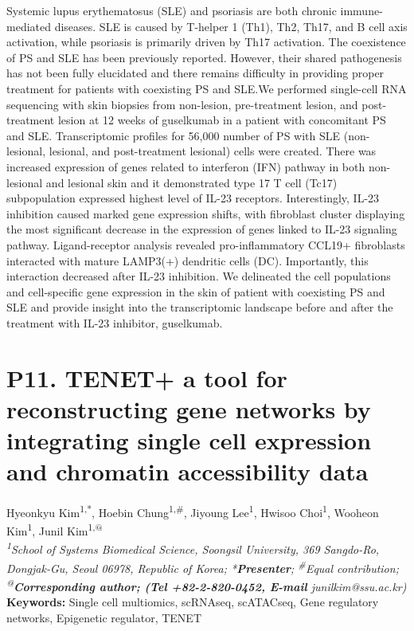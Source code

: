 \noindent
Systemic lupus erythematosus (SLE) and psoriasis are both chronic immune-mediated diseases. SLE is caused by T-helper 1 (Th1), Th2, Th17, and B cell axis activation, while psoriasis is primarily driven by Th17 activation. The coexistence of PS and SLE has been previously reported. However, their shared pathogenesis has not been fully elucidated and there remains difficulty in providing proper treatment for patients with coexisting PS and SLE.We performed single-cell RNA sequencing with skin biopsies from non-lesion, pre-treatment lesion, and post-treatment lesion at 12 weeks of guselkumab in a patient with concomitant PS and SLE. Transcriptomic profiles for 56,000 number of PS with SLE (non-lesional, lesional, and post-treatment lesional) cells were created. There was increased expression of genes related to interferon (IFN) pathway in both non-lesional and lesional skin and it demonstrated type 17 T cell (Tc17) subpopulation expressed highest level of IL-23 receptors. Interestingly, IL-23 inhibition caused marked gene expression shifts, with fibroblast cluster displaying the most significant decrease in the expression of genes linked to IL-23 signaling pathway. Ligand-receptor analysis revealed pro-inflammatory CCL19+ fibroblasts interacted with mature LAMP3(+) dendritic cells (DC). Importantly, this interaction decreased after IL-23 inhibition. We delineated the cell populations and cell-specific gene expression in the skin of patient with coexisting PS and SLE and provide insight into the transcriptomic landscape before and after the treatment with IL-23 inhibitor, guselkumab.
\newpage

\section*{P11. TENET+ a tool for reconstructing gene networks by integrating single cell expression and chromatin accessibility data}

\begin{center}
Hyeonkyu Kim\textsuperscript{1,*}, Hoebin Chung\textsuperscript{1,\#}, Jiyoung Lee\textsuperscript{1}, Hwisoo Choi\textsuperscript{1}, Wooheon Kim\textsuperscript{1}, Junil Kim\textsuperscript{1,@} \\
\vspace{0.3cm}
\textit{\textsuperscript{1}School of Systems Biomedical Science, Soongsil University, 369 Sangdo-Ro, Dongjak-Gu, Seoul 06978, Republic of Korea; *\textbf{Presenter}; \textsuperscript{\#}Equal contribution; \textsuperscript{@}\textbf{Corresponding author; (Tel +82-2-820-0452, E-mail} junilkim@ssu.ac.kr)} \\
\vspace{0.3cm}
\textbf{Keywords:} Single cell multiomics, scRNAseq, scATACseq, Gene regulatory networks, Epigenetic regulator, TENET
\end{center}

